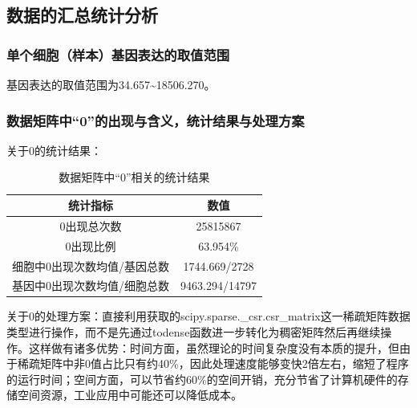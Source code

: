 \documentclass {article}
\begin{document}
	\subsection{数据的汇总统计分析}
		\subsubsection{单个细胞（样本）基因表达的取值范围}
			基因表达的取值范围为34.657\~{}18506.270。
			\subsubsection{数据矩阵中“0”的出现与含义，统计结果与处理方案}
			关于0的统计结果：
			\begin{table}[H]
				\centering
				\caption{数据矩阵中“0”相关的统计结果} 
				\begin{tabular}{cc}
					\hline
					统计指标 & 数值 \\ \hline
					0出现总次数            & 25815867 \\                                                         
					0出现比例             & 63.954\%  \\
					细胞中0出现次数均值/基因总数 & 1744.669/2728  \\
					基因中0出现次数均值/细胞总数 & 9463.294/14797	 \\ 
					\hline
				\end{tabular}
			\end{table}
		
			\label{处理方案}
			关于0的处理方案：直接利用获取的scipy.sparse.\_csr.csr\_matrix这一稀疏矩阵数据类型进行操作，而不是先通过todense函数进一步转化为稠密矩阵然后再继续操作。这样做有诸多优势：时间方面，虽然理论的时间复杂度没有本质的提升，但由于稀疏矩阵中非0值占比只有约40\%，因此处理速度能够变快2倍左右，缩短了程序的运行时间；空间方面，可以节省约60\%的空间开销，充分节省了计算机硬件的存储空间资源，工业应用中可能还可以降低成本。
		
\end{document}
